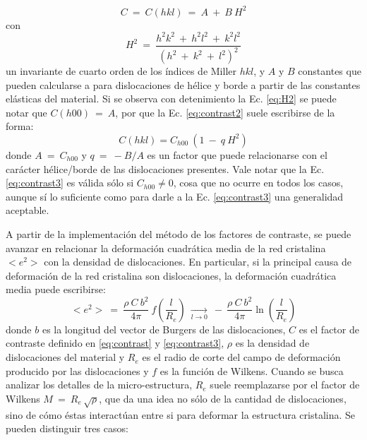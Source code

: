\begin{equation}
  C \ = \ C(hkl) \ = \ A \ + \ B \ H^2
  \label{eq:contrast2}
\end{equation}
\noindent
con
\begin{equation}
  H^2 \ = \ \frac{h^2k^2 \ + \ h^2l^2 \ + \ k^2l^2}{(h^2 \ + \ k^2 \ + \ l^2)^2}
  \label{eq:H2}
\end{equation}
\noindent
un invariante de cuarto orden de los índices de Miller $hkl$, y $A$ y $B$ constantes que pueden calcularse a para dislocaciones de hélice y borde a partir de las constantes elásticas del material.
Si se observa con detenimiento la Ec. \ref{eq:H2} se puede notar que $C(h00) \ = \ A$, por que la Ec. \ref{eq:contrast2} suele escribirse de la forma:
\begin{equation}
  C(hkl) = C_{h00}\ (1 \ - \ q\ H^2)
  \label{eq:contrast3}
\end{equation}
\noindent
donde $A \ = \ C_{h00}$ y $q \ = \ -B/A$ es un factor que puede relacionarse con el carácter hélice/borde de las dislocaciones presentes.
Vale notar que la Ec. \ref{eq:contrast3} es válida sólo si $C_{h00} \neq 0$, cosa que no ocurre en todos los casos, aunque sí lo suficiente como para darle a la Ec. \ref{eq:contrast3} una generalidad aceptable.

A partir de la implementación del método de los factores de contraste, se puede avanzar en relacionar la deformación cuadrática media de la red cristalina $<e^2>$ con la densidad de dislocaciones. En particular, si la principal causa de deformación de la red cristalina son dislocaciones, la deformación cuadrática media puede escribirse\cite{Wilkens1970}:
\begin{equation}
  <e^2> \ = \ \frac{\rho \ C \ b^2}{4 \pi} \ f\left(\frac{l}{R_e}\right) \ \xrightarrow[l \to 0]{} \ - \ \frac{\rho \ C \ b^2}{4 \pi} \ln \left(\frac{l}{R_e}\right)
  \label{eq:Wilkens}
\end{equation}
\noindent
donde $b$ es la longitud del vector de Burgers de las dislocaciones, $C$ es el factor de contraste definido en \ref{eq:contrast} y \ref{eq:contrast3}, $\rho$ es la densidad de dislocaciones del material y $R_e$ es el radio de corte del campo de deformación producido por las dislocaciones y $f$ es la función de Wilkens. 
Cuando se busca analizar los detalles de la micro-estructura, $R_e$ suele reemplazarse por el factor de Wilkens $M \ = \ R_e\,\sqrt{\rho}$, que da una idea no sólo de la cantidad de dislocaciones, sino de cómo éstas interactúan entre si para deformar la estructura cristalina. Se pueden distinguir tres casos:

